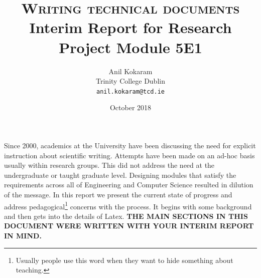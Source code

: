 \documentclass[11pt, a4paper]{article}
\begin{document}
\title{\textbf{\textsc{\Huge Writing technical documents}}\\ 
        {\Large Interim Report for Research Project Module 5E1}
      }
\author{Anil Kokaram \\ 
        Trinity College Dublin \\
        {\tt anil.kokaram@tcd.ie}
        }

\date{October 2018}

\maketitle

\begin{center}
\end{center}


Since 2000, academics at the University have been discussing the need for explicit instruction about scientific writing. Attempts have been made on an ad-hoc basis usually within research groups. This did not address the need at the undergraduate or taught graduate level. Designing modules that satisfy the requirements across all of Engineering and Computer Science resulted in dilution of the message. In this report we present the current state of progress and address pedagogical\footnote{Usually people use this word when they want to hide something about teaching.} concerns with the process. It begins with some background and then gets into the details of Latex. {\bf THE MAIN SECTIONS IN THIS DOCUMENT WERE WRITTEN WITH YOUR INTERIM REPORT IN MIND.}
\end{document}
